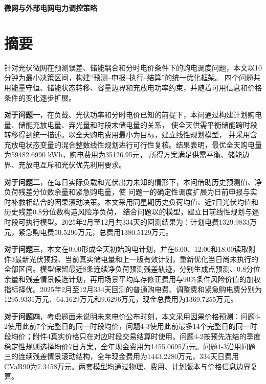 \documentclass[UTF8,a4paper,12pt]{ctexart}
\newcommand{\ModelBoldFont}{\CJKfamily{modelboldhei}\bfseries}
\begin{document}
\begin{center}
  {\ModelBoldFont\fontsize{22pt}{28pt}\selectfont 微网与外部电网电力调控策略\par}
\end{center}

\vspace{1em}

\section*{摘要}

针对光伏微网在预测误差、储能耦合和分时电价条件下的购电调度问题，本文以10分钟为最小决策区间，构建“预测--申报--执行--结算”的统一优化框架。
四个问题共用能量守恒、储能状态转移、容量边界和充放电功率约束，并随着可用信息和价格条件的变化逐步扩展。

\textbf{对于问题一}，在负载、光伏功率和分时电价已知的前提下，本问通过构建计划购电量、储能充放电量、弃光量和时段末储电量的关系，
使全天供需平衡储能跨时段转移得到统一描述。以全天购电费用最小为目标，建立线性规划模型，
并采用含充放电状态变量的混合整数线性规划进行可行性复核。结果表明，最优全天购电量为59482.6990 kWh，购电费用为35126.95元，
所得方案满足供需平衡、储能边界、充放电互斥和光伏优先利用要求。

\textbf{对于问题二}，在每日实际负载和光伏出力未知的情形下，本问借助历史预测值、净负荷残差分位数余量和紧急购电量，使
问题一的确定性调度扩展为日前申报与实时补救相结合的因果滚动决策。本文采用同星期历史负荷均值、近7日光伏均值和历史残差0.8分位数构造风险净负荷，
结合问题以的模型，建立日前线性规划与逐时段可执行模型。2025年2月至12月共334天的回测结果为：计划电费1329.9833万元，紧急购电费50.5296万元，总费用1380.5129万元。

\textbf{对于问题三}，本文在0:00形成全天初始购电计划，并在6:00、12:00和18:00读取附件3最新光伏预报、当前真实储电量和上一版有效计划，重新优化当日尚未执行的全部区间。模型保留最近8条连续净负荷预测残差轨迹，分别生成点预测、0.8分位余量和残差情景候选计划，再用场景平均库存修正费用与90\%条件风险价值的加权指标择优。2025年2月至12月334天回测的普通购电费、调整费和紧急购电费分别为1295.9331万元、64.1629万元和9.6296万元，现金总费用为1369.7255万元。

\textbf{对于问题四}，考虑题面未说明未来电价公布时刻，本文采用因果价格预测：问题4-2使用此前7个完整日的同一时段均价，问题4-3使用此前最多14个完整日的同一时段均价；附件4真实价格只在对应时段交易结算时使用。问题4-2按预先冻结的季度稳定性规则选择均价7日方案，全年现金费用为1455.0695万元。问题4-3沿用问题三的连续残差情景滚动结构，全年现金费用为1443.2280万元，334天日费用CVaR90为7.3458万元。两套模型均通过物理、费用、计划版本与价格信息边界复算。
\end{document}
